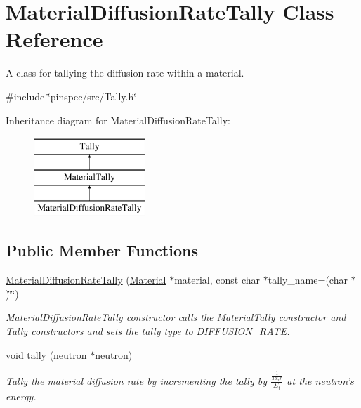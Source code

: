 \hypertarget{classMaterialDiffusionRateTally}{\section{Material\-Diffusion\-Rate\-Tally Class Reference}
\label{classMaterialDiffusionRateTally}
}


A class for tallying the diffusion rate within a material.  




{\ttfamily \#include \char`\"{}pinspec/src/\-Tally.\-h\char`\"{}}

Inheritance diagram for Material\-Diffusion\-Rate\-Tally\-:\begin{figure}[H]
\begin{center}
\leavevmode
\includegraphics[height=3.000000cm]{classMaterialDiffusionRateTally}
\end{center}
\end{figure}
\subsection*{Public Member Functions}
\begin{DoxyCompactItemize}
\item 
\hyperlink{classMaterialDiffusionRateTally_a5339ada27f620235e11547d008d91f95}{Material\-Diffusion\-Rate\-Tally} (\hyperlink{classMaterial}{Material} $\ast$material, const char $\ast$tally\-\_\-name=(char $\ast$)\char`\"{}\char`\"{})
\begin{DoxyCompactList}\small\item\em \hyperlink{classMaterialDiffusionRateTally}{Material\-Diffusion\-Rate\-Tally} constructor calls the \hyperlink{classMaterialTally}{Material\-Tally} constructor and \hyperlink{classTally}{Tally} constructors and sets the tally type to D\-I\-F\-F\-U\-S\-I\-O\-N\-\_\-\-R\-A\-T\-E. \end{DoxyCompactList}\item 
void \hyperlink{classMaterialDiffusionRateTally_a63bd04bab0e138059384e35d925a5ce0}{tally} (\hyperlink{structneutron}{neutron} $\ast$\hyperlink{structneutron}{neutron})
\begin{DoxyCompactList}\small\item\em \hyperlink{classTally}{Tally} the material diffusion rate by incrementing the tally by $ \frac{\frac{1}{3\Sigma_tr}}{\Sigma_t} $ at the neutron's energy. \end{DoxyCompactList}\end{DoxyCompactItemize}
